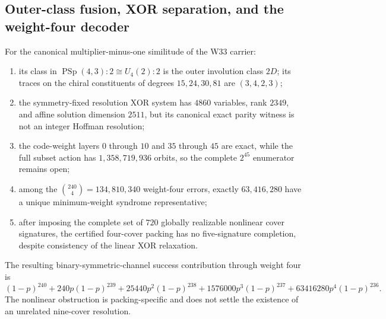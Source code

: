 \makeatletter
{}
\makeatother
\providecommand{\PSp}{\operatorname{PSp}}
\providecommand{\GF}{\mathbb F}

\subsection{Outer-class fusion, XOR separation, and the weight-four decoder}

\begin{theorem}[Passes 1826--1830]
For the canonical multiplier-minus-one similitude of the W33 carrier:
\begin{enumerate}
\item its class in $\PSp(4,3){:}2\cong U_4(2){:}2$ is the outer involution class $2D$; its traces on the chiral constituents of degrees $15,24,30,81$ are $(3,4,2,3)$;
\item the symmetry-fixed resolution XOR system has $4860$ variables, rank $2349$, and affine solution dimension $2511$, but its canonical exact parity witness is not an integer Hoffman resolution;
\item the code-weight layers $0$ through $10$ and $35$ through $45$ are exact, while the full subset action has $1{,}358{,}719{,}936$ orbits, so the complete $2^{45}$ enumerator remains open;
\item among the $\binom{240}{4}=134{,}810{,}340$ weight-four errors, exactly $63{,}416{,}280$ have a unique minimum-weight syndrome representative;
\item after imposing the complete set of $720$ globally realizable nonlinear cover signatures, the certified four-cover packing has no five-signature completion, despite consistency of the linear XOR relaxation.
\end{enumerate}
\end{theorem}

The resulting binary-symmetric-channel success contribution through weight four is
\[
(1-p)^{240}+240p(1-p)^{239}+25440p^2(1-p)^{238}
+1576000p^3(1-p)^{237}+63416280p^4(1-p)^{236}.
\]
The nonlinear obstruction is packing-specific and does not settle the existence of an unrelated nine-cover resolution.
